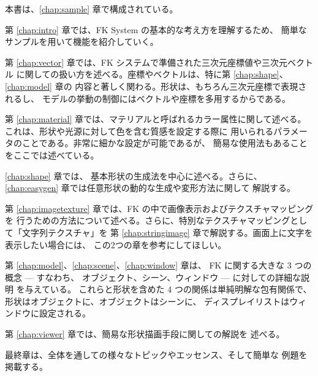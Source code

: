 本書は、\ref{chap:sample} 章で構成されている。

第 \ref{chap:intro} 章では、FK System の基本的な考え方を理解するため、
簡単なサンプルを用いて機能を紹介していく。

第 \ref{chap:vector} 章では、FK システムで準備された三次元座標値や三次元ベクトル
に関しての扱い方を述べる。座標やベクトルは、特に第 \ref{chap:shape}、
\ref{chap:model} 章の
内容と著しく関わる。形状は、もちろん三次元座標で表現されるし、
モデルの挙動の制御にはベクトルや座標を多用するからである。

第 \ref{chap:material} 章では、マテリアルと呼ばれるカラー属性に関して述べる。
これは、形状や光源に対して色を含む質感を設定する際に
用いられるパラメータのことである。非常に細かな設定が可能であるが、
簡易な使用法もあることをここでは述べている。

\ref{chap:shape} 章では、
基本形状の生成法を中心に述べる。さらに、
\ref{chap:easygen} 章では任意形状の動的な生成や変形方法に関して
解説する。


第 \ref{chap:imagetexture} 章では、FK の中で画像表示およびテクスチャマッピングを
行うための方法について述べる。さらに、特別なテクスチャマッピングとして「文字列テクスチャ」を
第 \ref{chap:stringimage} 章で解説する。画面上に文字を表示したい場合には、
この2つの章を参考にしてほしい。

第 \ref{chap:model}、\ref{chap:scene}、\ref{chap:window} 章は、
FK に関する大きな 3 つの概念 --- すなわち、
オブジェクト、シーン、ウィンドウ --- に対しての詳細な説明
を与えている。
これらと形状を含めた 4 つの関係は単純明解な包有関係で、
形状はオブジェクトに、オブジェクトはシーンに、
ディスプレイリストはウィンドウに設定される。

第 \ref{chap:viewer} 章では、簡易な形状描画手段に関しての解説を
述べる。

最終章は、全体を通しての様々なトピックやエッセンス、そして簡単な
例題を掲載する。
